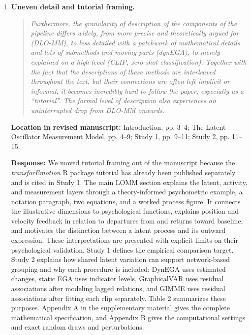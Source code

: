 \documentclass[11pt]{article}
\newenvironment{reviewquote}{\begin{quote}\small\itshape}{\end{quote}}
\newcommand{\point}[1]{\textbf{#1.}}
\newcommand{\location}[1]{\textbf{Location in revised manuscript:} #1\par}
\newcommand{\response}{\textbf{Response:} }
\begin{document}
\begin{enumerate}
  \item \point{Uneven detail and tutorial framing}
  \begin{reviewquote}
  Furthermore, the granularity of description of the components of the pipeline differs widely, from more precise and theoretically argued for (DLO-MM), to less detailed with a patchwork of mathematical details and lots of submethods and moving parts (dynEGA), to merely explained on a high level (CLIP, zero-shot classification). Together with the fact that the descriptions of these methods are interleaved throughout the text, but their connections are often left implicit or informal, it becomes incredibly hard to follow the paper, especially as a ``tutorial''. The formal level of description also experiences an uninterrupted drop from DLO-MM onwards.
  \end{reviewquote}
  \location{Introduction, pp. 3--4; The Latent Oscillator Measurement Model, pp. 4--9; Study 1, pp. 9--11; Study 2, pp. 11--15.}
  \response We moved tutorial framing out of the manuscript because the \textit{transforEmotion} R package tutorial has already been published separately and is cited in Study 1. The main LOMM section explains the latent, activity, and measurement layers through a theory-informed psychometric example, a notation paragraph, two equations, and a worked process figure. It connects the illustrative dimensions to psychological functions, explains position and velocity feedback in relation to departures from and returns toward baseline, and motivates the distinction between a latent process and its outward expression. These interpretations are presented with explicit limits on their psychological validation. Study 1 defines the empirical comparison target. Study 2 explains how shared latent variation can support network-based grouping and why each procedure is included: DynEGA uses estimated changes, static EGA uses indicator levels, GraphicalVAR uses residual associations after modeling lagged relations, and GIMME uses residual associations after fitting each clip separately. Table 2 summarizes these purposes. Appendix A in the supplementary material gives the complete mathematical specification, and Appendix B gives the computational settings and exact random draws and perturbations.


\end{enumerate}
\end{document}
